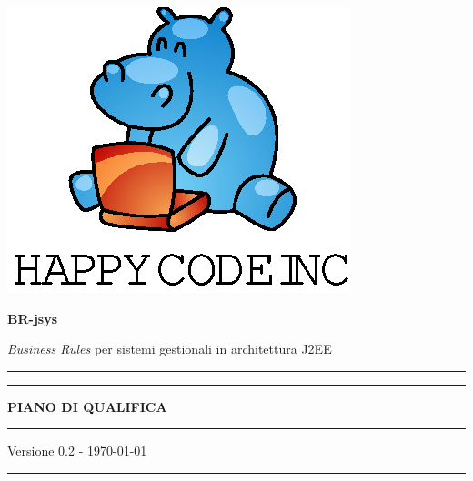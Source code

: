 \documentclass[11pt,titlepage,a4paper]{report}
\begin{document}

\begin{titlepage}
\begin{center}
\vspace*{0.5in}
\includegraphics{logo.eps}
\vspace*{0.2in}

{\Large \textbf{BR-jsys}}

{\Large \emph{Business Rules} per sistemi gestionali in architettura J2EE } 
\vspace{1.3in}
\par\rule{10cm}{.4pt} \par
\par\rule{12cm}{1pt} \par
\vspace*{0.5in}
\LARGE \textbf {PIANO DI QUALIFICA}
\vspace*{0.5in}
\par\rule{12cm}{1pt} \par
{\large Versione 0.2 - \today}
\par\rule{10cm}{.4pt} \par

\end{center}
\end{titlepage}
\vspace*{0.5in}
\end{document}
